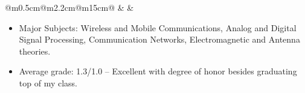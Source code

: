 \documentclass[10pt,a4paper]{article}
\begin{document}
\vspace{0.4em}                       
\begin{tabular}{@{}m{0.5cm}@{\hspace{0.5em}}m{2.2cm}@{\hspace{0.5em}}m{15cm}@{}}
   & 
  \raisebox{1.8em}{\begin{minipage}[t]{\linewidth}
  \centering
    \textcolor{blocktitle1_color}{Sep. 05}\\
    \textcolor{blocktitle1_color}{Feb. 10}
  \end{minipage}
  } &
\end{tabular}             

\vspace{-1em}
\begin{itemize}[leftmargin=*]
  \item Major Subjects: Wireless and Mobile Communications, Analog and Digital Signal Processing, Communication Networks, Electromagnetic and Antenna theories.
  \item Average grade: 1.3/1.0 – Excellent with degree of honor besides graduating top of my class.
\end{itemize}   
\end{document}
